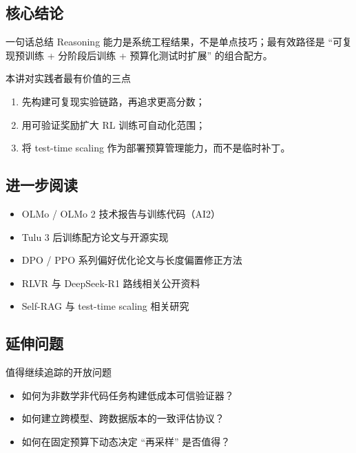 \documentclass[a4paper]{article}
\begin{document}
\subsection{核心结论}
\begin{importantbox}{一句话总结}
Reasoning 能力是系统工程结果，不是单点技巧；最有效路径是 ``可复现预训练 + 分阶段后训练 + 预算化测试时扩展'' 的组合配方。
\end{importantbox}

\begin{knowledgebox}{本讲对实践者最有价值的三点}
\begin{enumerate}
    \item 先构建可复现实验链路，再追求更高分数；
    \item 用可验证奖励扩大 RL 训练可自动化范围；
    \item 将 test-time scaling 作为部署预算管理能力，而不是临时补丁。
\end{enumerate}
\end{knowledgebox}

\subsection{进一步阅读}
\begin{itemize}
    \item OLMo / OLMo 2 技术报告与训练代码（AI2）
    \item Tulu 3 后训练配方论文与开源实现
    \item DPO / PPO 系列偏好优化论文与长度偏置修正方法
    \item RLVR 与 DeepSeek-R1 路线相关公开资料
    \item Self-RAG 与 test-time scaling 相关研究
\end{itemize}

\subsection{延伸问题}
\begin{warningbox}{值得继续追踪的开放问题}
\begin{itemize}
    \item 如何为非数学非代码任务构建低成本可信验证器？
    \item 如何建立跨模型、跨数据版本的一致评估协议？
    \item 如何在固定预算下动态决定 ``再采样'' 是否值得？
\end{itemize}
\end{warningbox}

\end{document}

